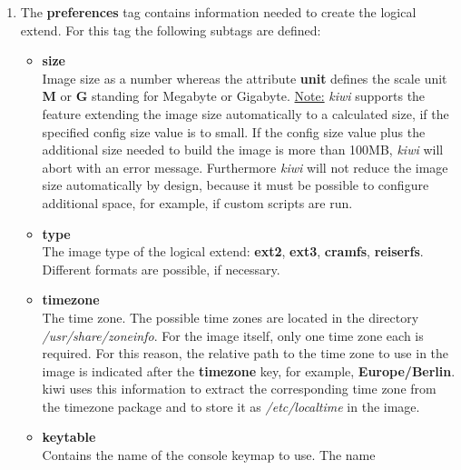 \begin{itemize}
      \begin{enumerate}
          \item The \textbf{preferences} tag contains information needed to
          create the logical extend. For this tag the following subtags
          are defined:
          \begin{itemize}
              \item \textbf{size}\\
                    Image size as a number whereas the attribute
                    \textbf{unit} defines the scale unit \textbf{M} or
                    \textbf{G} standing for Megabyte or Gigabyte.
                    \underline{Note:}
                    \textit{kiwi} supports the feature extending the image size
                    automatically to a calculated size, if the specified
                    config size value is to small. If the config size value
                    plus the additional size needed to build the image is more
                    than 100MB, \textit{kiwi} will abort with an error message.
                    Furthermore \textit{kiwi} will not reduce the image size
                    automatically by design, because it must be possible to
                    configure additional space, for example, if custom scripts
                    are run.
              \item \textbf{type}\\
                    The image type of the logical extend: \textbf{ext2},
                    \textbf{ext3}, \textbf{cramfs}, \textbf{reiserfs}.
                    Different formats are possible, if necessary.
              \item \textbf{timezone}\\
                    The time zone. The possible time zones are located in the
                    directory \textit{/usr/share/zoneinfo}. For the image
                    itself, only one time zone each is required. For this
                    reason, the relative path to the time zone to use in the
                    image is indicated after the \textbf{timezone} key, for
                    example, \textbf{Europe/Berlin}. kiwi uses this information
                    to extract the corresponding time zone from the timezone
                    package and to store it as \textit{/etc/localtime} in the
                    image.
              \item \textbf{keytable}\\
                    Contains the name of the console keymap to use. The name

\end{itemize}
\end{enumerate}
\end{itemize}
